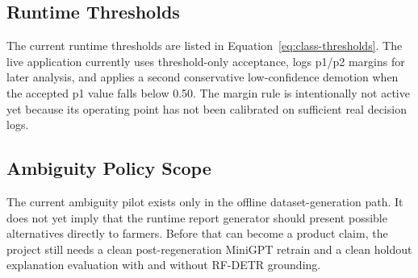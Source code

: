 \subsection{Runtime Thresholds}

The current runtime thresholds are listed in Equation~\ref{eq:class-thresholds}. The live application currently uses threshold-only acceptance, logs p1/p2 margins for later analysis, and applies a second conservative low-confidence demotion when the accepted p1 value falls below 0.50. The margin rule is intentionally not active yet because its operating point has not been calibrated on sufficient real decision logs.

\subsection{Ambiguity Policy Scope}

The current ambiguity pilot exists only in the offline dataset-generation path. It does not yet imply that the runtime report generator should present possible alternatives directly to farmers. Before that can become a product claim, the project still needs a clean post-regeneration MiniGPT retrain and a clean holdout explanation evaluation with and without RF-DETR grounding.
